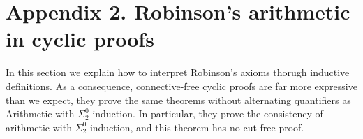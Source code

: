 \documentclass[a4paper,12pt]{article}
\newcommand{\Nat}               { {\tt N}  }
\newcommand{\hy}        { {\operatorname{-}}}
\begin{document}
%

\section{Appendix 2. Robinson's arithmetic in cyclic proofs}
In this section we explain how to interpret Robinson's axioms thorugh inductive definitions. As a consequence, connective-free cyclic proofs are far more expressive than we expect, they prove the same theorems without alternating quantifiers as Arithmetic with $\Sigma^0_2$-induction. In particular, they prove the consistency of arithmetic with $\Sigma^0_2$-induction, and this theorem has no cut-free proof.  
\end{document}

